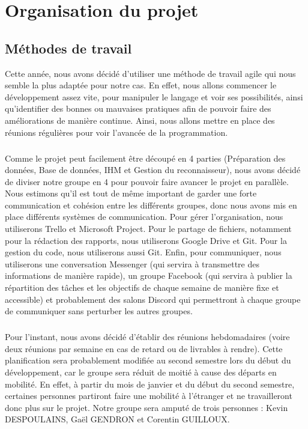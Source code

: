 \chapter{Organisation du projet}

\section{Méthodes de travail}

Cette année, nous avons décidé d’utiliser une méthode de travail agile qui nous
semble la plus adaptée pour notre cas. En effet, nous allons commencer le développement
assez vite, pour manipuler le langage et voir ses possibilités, ainsi qu'identifier
des bonnes ou mauvaises pratiques afin de pouvoir faire des améliorations de manière continue.
Ainsi, nous allons mettre en place des réunions régulières pour voir l’avancée de la programmation.

\paragraph{}
Comme le projet peut facilement être découpé en 4 parties (Préparation des données,
Base de données, IHM et Gestion du reconnaisseur), nous avons décidé de diviser notre
groupe en 4 pour pouvoir faire avancer le projet en parallèle. Nous estimons qu’il est
tout de même important de garder une forte communication et cohésion entre les différents
groupes, donc nous avons mis en place différents systèmes de communication. Pour gérer
l’organisation, nous utiliserons Trello et Microsoft Project. Pour le partage de fichiers,
notamment pour la rédaction des rapports, nous utiliserons Google Drive et Git.
Pour la gestion du code, nous utiliserons aussi Git. Enfin, pour communiquer, nous
utiliserons une conversation Messenger (qui servira à transmettre des informations de
manière rapide), un groupe Facebook (qui servira à publier la répartition des tâches et
les objectifs de chaque semaine de manière fixe et accessible) et probablement des salons
Discord qui permettront à chaque groupe de communiquer sans perturber les autres groupes.

\paragraph{}
Pour l’instant, nous avons décidé d’établir des réunions hebdomadaires (voire deux réunions
par semaine en cas de retard ou de livrables à rendre). Cette planification sera probablement
modifiée au second semestre lors du début du développement, car le groupe sera réduit de
moitié à cause des départs en mobilité. En effet, à partir du mois de janvier et du début du
second semestre, certaines personnes partiront faire une mobilité à l’étranger et ne
travailleront donc plus sur le projet. Notre groupe sera amputé de trois personnes : Kevin
DESPOULAINS, Gaël GENDRON et Corentin GUILLOUX.

